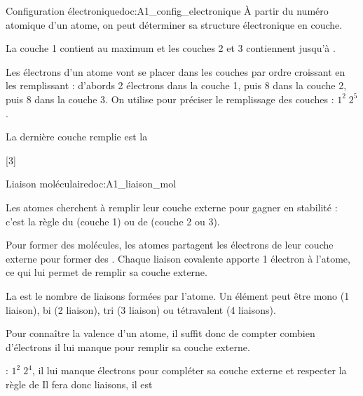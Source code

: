 \begin{doc}{Configuration électronique}{doc:A1_config_electronique}
  À partir du numéro atomique d'un atome, on peut déterminer sa structure électronique en couche.
  
  \begin{importants}
    La couche 1 contient au maximum  et les couches 2 et 3 contiennent jusqu'à .
  \end{importants}
  Les électrons d'un atome vont se placer dans les couches par ordre croissant en les remplissant : d'abords 2 électrons dans la couche 1, puis 8 dans la couche 2, puis 8 dans la couche 3.
  On utilise  pour préciser le remplissage des couches
  \exemple {} : $1^2\; 2^5$. 
  \begin{importants}
    La dernière couche remplie est la 
  \end{importants}
  
\end{doc}

[3]


\begin{doc}{Liaison moléculaire}{doc:A1_liaison_mol}
  \begin{importants}
    Les atomes cherchent à remplir leur couche externe pour gagner en stabilité : c'est la règle du  (couche 1) ou de  (couche 2 ou 3).
  \end{importants}
  
  \begin{importants}
    Pour former des molécules, les atomes partagent les électrons de leur couche externe pour former des .
    Chaque liaison covalente apporte 1 électron à l'atome, ce qui lui permet de remplir sa couche externe.
  \end{importants}
  \begin{importants}
    La  est le nombre de liaisons formées par l'atome.
    Un élément peut être mono (1 liaison), bi (2 liaison), tri (3 liaison) ou tétravalent (4 liaisons).
  \end{importants}
  Pour connaître la valence d'un atome, il suffit donc de compter combien d'électrons il lui manque pour remplir sa couche externe.

  \exemple {} : $1^2\; 2^4$,
  il lui manque  électrons pour compléter sa couche externe et respecter la règle de 
  Il fera donc  liaisons, il est 
\end{doc}

